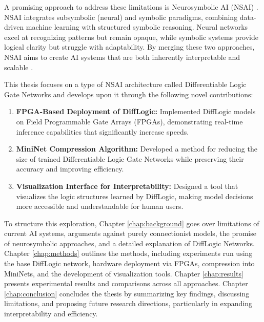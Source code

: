 
A promising approach to address these limitations is Neurosymbolic AI (NSAI) \cite{sarker2021neurosymbolicartificialintelligencecurrent}. NSAI integrates subsymbolic (neural) and symbolic paradigms, combining data-driven machine learning with structured symbolic reasoning. Neural networks excel at recognizing patterns but remain opaque, while symbolic systems provide logical clarity but struggle with adaptability. By merging these two approaches, NSAI aims to create AI systems that are both inherently interpretable and scalable \cite{zhang2024neurosymbolicaiexplainabilitychallenges, sheth2023neurosymbolicaiwhy}. 

This thesis focuses on a type of NSAI architecture called Differentiable Logic Gate Networks \cite{difflogic} and develops upon it through the following novel contributions:

\begin{enumerate}[noitemsep,topsep=0pt]

    \item \textbf{FPGA-Based Deployment of DiffLogic:} Implemented DiffLogic models on Field Programmable Gate Arrays (FPGAs), demonstrating real-time inference capabilities that significantly increase speeds.
    \item \textbf{MiniNet Compression Algorithm:} Developed a method for reducing the size of trained Differentiable Logic Gate Networks while preserving their accuracy and improving efficiency.
    \item \textbf{Visualization Interface for Interpretability:} Designed a tool that visualizes the logic structures learned by DiffLogic, making model decisions more accessible and understandable for human users.
\end{enumerate}

To structure this exploration, Chapter \ref{chap:background} goes over limitations of current AI systems, arguments against purely connectionist models, the promise of neurosymbolic approaches, and a detailed explanation of DiffLogic Networks. Chapter \ref{chap:methods} outlines the methods, including experiments run using the base DiffLogic network, hardware deployment via FPGAs, compression into MiniNets, and the development of visualization tools. Chapter \ref{chap:results} presents experimental results and comparisons across all approaches. Chapter \ref{chap:conclusion} concludes the thesis by summarizing key findings, discussing limitations, and proposing future research directions, particularly in expanding interpretability and efficiency.
